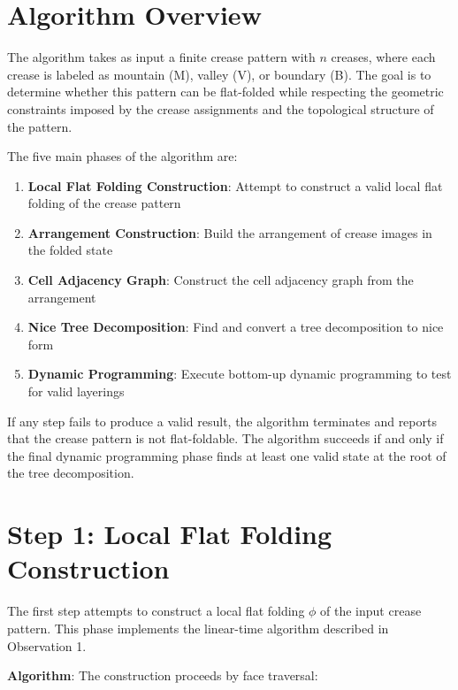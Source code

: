 \section{Algorithm Overview}

The algorithm takes as input a finite crease pattern with $n$ creases, where each crease is labeled as mountain (M), valley (V), or boundary (B). The goal is to determine whether this pattern can be flat-folded while respecting the geometric constraints imposed by the crease assignments and the topological structure of the pattern.

The five main phases of the algorithm are:

\begin{enumerate}
\item \textbf{Local Flat Folding Construction}: Attempt to construct a valid local flat folding of the crease pattern
\item \textbf{Arrangement Construction}: Build the arrangement of crease images in the folded state
\item \textbf{Cell Adjacency Graph}: Construct the cell adjacency graph from the arrangement
\item \textbf{Nice Tree Decomposition}: Find and convert a tree decomposition to nice form
\item \textbf{Dynamic Programming}: Execute bottom-up dynamic programming to test for valid layerings
\end{enumerate}

If any step fails to produce a valid result, the algorithm terminates and reports that the crease pattern is not flat-foldable. The algorithm succeeds if and only if the final dynamic programming phase finds at least one valid state at the root of the tree decomposition.

\section{Step 1: Local Flat Folding Construction}

The first step attempts to construct a local flat folding $\phi$ of the input crease pattern. This phase implements the linear-time algorithm described in Observation 1.

\textbf{Algorithm}: The construction proceeds by face traversal:

